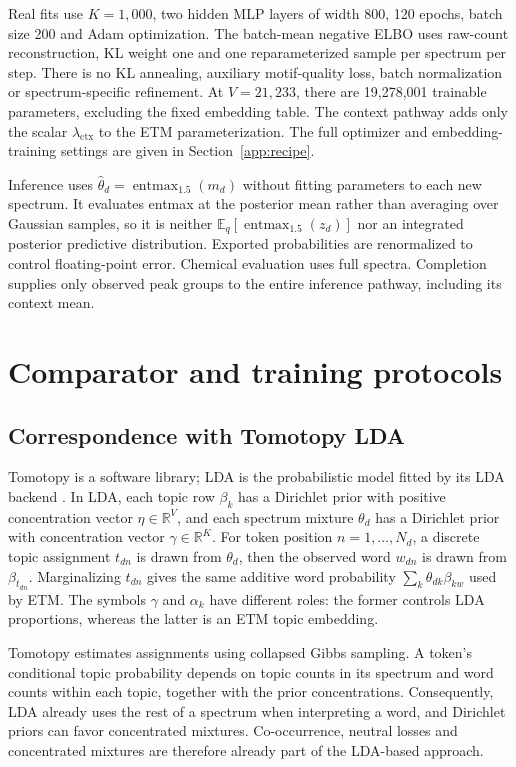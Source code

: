 \documentclass[10pt,a4paper]{article}
\newcommand{\entmax}{\operatorname{entmax}_{1.5}}
\newcommand{\ctxscale}{\lambda_{\mathrm{ctx}}}
\begin{document}
Real fits use $K=1,000$, two hidden MLP layers of width 800, 120 epochs, batch size
200 and Adam optimization. The batch-mean negative ELBO uses raw-count reconstruction,
KL weight one and one reparameterized sample per spectrum per step.
There is no KL annealing, auxiliary motif-quality loss, batch normalization
or spectrum-specific refinement.
At $V=21,233$, there are 19,278,001 trainable parameters, excluding the fixed
embedding table. The context pathway adds only the scalar $\ctxscale$ to the ETM
parameterization. The full optimizer and embedding-training settings are
given in Section~\ref{app:recipe}.

Inference uses $\widehat\theta_d=\entmax(m_d)$ without fitting parameters
to each new spectrum. It evaluates entmax at the posterior mean rather than
averaging over Gaussian samples, so it is neither
$\mathbb E_q[\entmax(z_d)]$ nor an integrated posterior predictive distribution.
Exported probabilities are renormalized to control floating-point error.
Chemical evaluation uses full spectra. Completion supplies only observed
peak groups to the entire inference pathway, including its context mean.


\section{Comparator and training protocols}
\label{sec:comparators}
\subsection{Correspondence with Tomotopy LDA}

Tomotopy is a software library; LDA is the probabilistic model fitted by its
LDA backend \cite{tomotopy,blei2003}. In LDA, each topic row $\beta_k$ has a
Dirichlet prior with positive concentration vector $\eta\in\mathbb R^V$,
and each spectrum mixture $\theta_d$ has a Dirichlet prior with concentration
vector $\gamma\in\mathbb R^K$. For token position $n=1,\ldots,N_d$, a discrete
topic assignment $t_{dn}$ is drawn from $\theta_d$, then the observed word
$w_{dn}$ is drawn from $\beta_{t_{dn}}$. Marginalizing $t_{dn}$ gives the same
additive word probability $\sum_k\theta_{dk}\beta_{kw}$ used by ETM.
The symbols $\gamma$ and $\alpha_k$ have different roles: the former controls
LDA proportions, whereas the latter is an ETM topic embedding.

Tomotopy estimates assignments using collapsed Gibbs sampling. A token's
conditional topic probability depends on topic counts in its spectrum and
word counts within each topic, together with the prior concentrations.
Consequently, LDA already uses the rest of a spectrum when interpreting a
word, and Dirichlet priors can favor concentrated mixtures. Co-occurrence,
neutral losses and concentrated mixtures are therefore already part of the
LDA-based approach.
\end{document}
